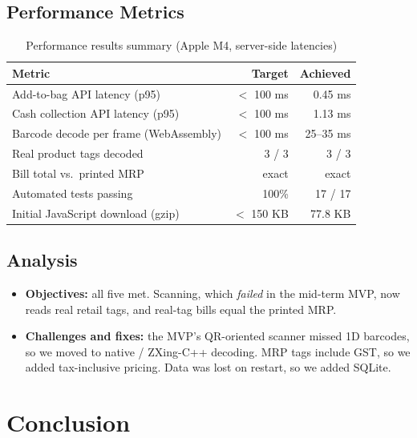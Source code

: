 \documentclass[12pt,letterpaper,twoside,openany]{report}
\begin{document}
\section{Performance Metrics}

\begin{table}[!htb]
  \centering
  \small
  \begin{tabular}{|l|r|r|}
    \hline
    \textbf{Metric} & \textbf{Target} & \textbf{Achieved} \\ \hline
    Add-to-bag API latency (p95) & $<$ 100 ms & 0.45 ms \\ \hline
    Cash collection API latency (p95) & $<$ 100 ms & 1.13 ms \\ \hline
    Barcode decode per frame (WebAssembly) & $<$ 100 ms & 25--35 ms \\ \hline
    Real product tags decoded & 3 / 3 & 3 / 3 \\ \hline
    Bill total vs.\ printed MRP & exact & exact \\ \hline
    Automated tests passing & 100\% & 17 / 17 \\ \hline
    Initial JavaScript download (gzip) & $<$ 150 KB & 77.8 KB \\ \hline
  \end{tabular}
  \caption{Performance results summary (Apple M4, server-side latencies)}
  \label{tab:results}
\end{table}

\section{Analysis}
\begin{itemize}[leftmargin=*]
  \item \textbf{Objectives:} all five met. Scanning, which \emph{failed} in the mid-term MVP,
        now reads real retail tags, and real-tag bills equal the printed MRP.
  \item \textbf{Challenges and fixes:} the MVP's QR-oriented scanner missed 1D barcodes, so we
        moved to native / ZXing-C++ decoding. MRP tags include GST, so we added tax-inclusive
        pricing. Data was lost on restart, so we added SQLite.
\end{itemize}

\chapter{Conclusion}
\end{document}
